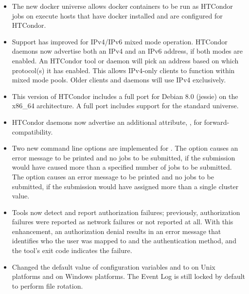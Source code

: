 \begin{itemize}

\item The new docker universe allows docker containers to be run
as HTCondor jobs on execute hosts that have docker installed and are
configured for HTCondor.

\item Support has improved for IPv4/IPv6 mixed mode operation.  
HTCondor daemons now advertise both an IPv4 and an IPv6 address,
if both modes are enabled.  
An HTCondor tool or daemon will pick an address based on which 
protocol(s) it has enabled.  
This allows IPv4-only clients to function within mixed mode pools.
Older clients and daemons will use IPv4 exclusively.

\item This version of HTCondor includes a full port for 
Debian 8.0 (jessie) on the x86\_64 architecture.
A full port includes support for the standard universe.

\item HTCondor daemons now advertise an additional attribute,
, for forward-compatibility.

\item Two new command line options are implemented for .
The  option causes an error message to be printed and
no jobs to be submitted,
if the submission would have caused more
than a specified number of jobs to be submitted.
The  option causes an error message to be printed and
no jobs to be submitted,
if the submission would have assigned more than a single cluster value.

\item Tools now detect and report authorization failures;
previously, authorization failures were reported as network failures
or not reported at all.
With this enhancement,
an authorization denial results in an error message 
that identifies who the user was mapped to and the authentication method,
and the tool's exit code indicates the failure.

\item Changed the default value of configuration variables
 and 
to  on Unix platforms and  on Windows platforms.
The Event Log is still locked by default to perform file rotation.


\end{itemize}
